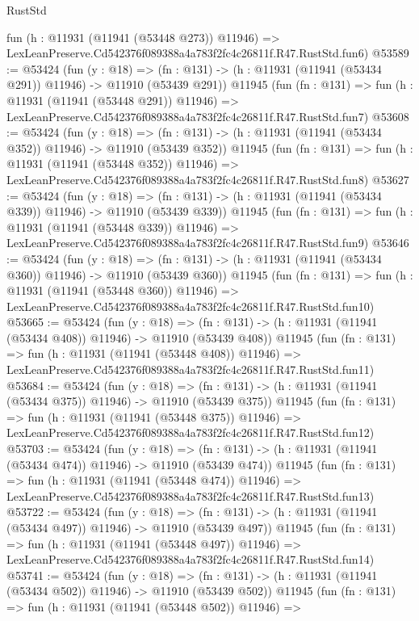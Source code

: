 \begin{lexlean}{RustStd}
\begin{coremodule}
    fun (h : @11931 (@11941 (@53448 @273)) @11946) =>
    LexLeanPreserve.Cd542376f089388a4a783f2fc4c26811f.R47.RustStd.fun6)
@53589 := @53424
    (fun (y : @18) =>
    (fn : @131) -> (h : @11931 (@11941 (@53434 @291)) @11946) -> @11910 (@53439 @291))
    @11945
    (fun (fn : @131) =>
    fun (h : @11931 (@11941 (@53448 @291)) @11946) =>
    LexLeanPreserve.Cd542376f089388a4a783f2fc4c26811f.R47.RustStd.fun7)
@53608 := @53424
    (fun (y : @18) =>
    (fn : @131) -> (h : @11931 (@11941 (@53434 @352)) @11946) -> @11910 (@53439 @352))
    @11945
    (fun (fn : @131) =>
    fun (h : @11931 (@11941 (@53448 @352)) @11946) =>
    LexLeanPreserve.Cd542376f089388a4a783f2fc4c26811f.R47.RustStd.fun8)
@53627 := @53424
    (fun (y : @18) =>
    (fn : @131) -> (h : @11931 (@11941 (@53434 @339)) @11946) -> @11910 (@53439 @339))
    @11945
    (fun (fn : @131) =>
    fun (h : @11931 (@11941 (@53448 @339)) @11946) =>
    LexLeanPreserve.Cd542376f089388a4a783f2fc4c26811f.R47.RustStd.fun9)
@53646 := @53424
    (fun (y : @18) =>
    (fn : @131) -> (h : @11931 (@11941 (@53434 @360)) @11946) -> @11910 (@53439 @360))
    @11945
    (fun (fn : @131) =>
    fun (h : @11931 (@11941 (@53448 @360)) @11946) =>
    LexLeanPreserve.Cd542376f089388a4a783f2fc4c26811f.R47.RustStd.fun10)
@53665 := @53424
    (fun (y : @18) =>
    (fn : @131) -> (h : @11931 (@11941 (@53434 @408)) @11946) -> @11910 (@53439 @408))
    @11945
    (fun (fn : @131) =>
    fun (h : @11931 (@11941 (@53448 @408)) @11946) =>
    LexLeanPreserve.Cd542376f089388a4a783f2fc4c26811f.R47.RustStd.fun11)
@53684 := @53424
    (fun (y : @18) =>
    (fn : @131) -> (h : @11931 (@11941 (@53434 @375)) @11946) -> @11910 (@53439 @375))
    @11945
    (fun (fn : @131) =>
    fun (h : @11931 (@11941 (@53448 @375)) @11946) =>
    LexLeanPreserve.Cd542376f089388a4a783f2fc4c26811f.R47.RustStd.fun12)
@53703 := @53424
    (fun (y : @18) =>
    (fn : @131) -> (h : @11931 (@11941 (@53434 @474)) @11946) -> @11910 (@53439 @474))
    @11945
    (fun (fn : @131) =>
    fun (h : @11931 (@11941 (@53448 @474)) @11946) =>
    LexLeanPreserve.Cd542376f089388a4a783f2fc4c26811f.R47.RustStd.fun13)
@53722 := @53424
    (fun (y : @18) =>
    (fn : @131) -> (h : @11931 (@11941 (@53434 @497)) @11946) -> @11910 (@53439 @497))
    @11945
    (fun (fn : @131) =>
    fun (h : @11931 (@11941 (@53448 @497)) @11946) =>
    LexLeanPreserve.Cd542376f089388a4a783f2fc4c26811f.R47.RustStd.fun14)
@53741 := @53424
    (fun (y : @18) =>
    (fn : @131) -> (h : @11931 (@11941 (@53434 @502)) @11946) -> @11910 (@53439 @502))
    @11945
    (fun (fn : @131) =>
    fun (h : @11931 (@11941 (@53448 @502)) @11946) =>

\end{coremodule}
\end{lexlean}
